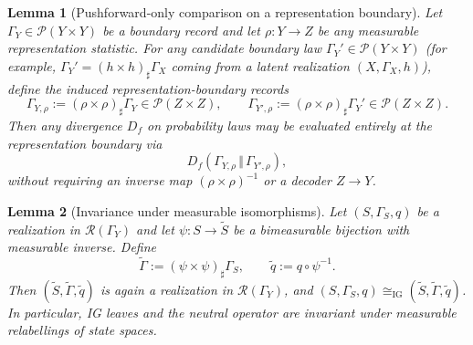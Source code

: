 \documentclass[11pt]{article}
\newtheorem{lemma}{Lemma}
\newcommand{\Pcal}{\mathcal{P}}
\begin{document}
\begin{lemma}[Pushforward-only comparison on a representation boundary]
\label{lem:pushforward-only-repboundary}
Let $\Gamma_Y\in\Pcal(Y\times Y)$ be a boundary record and let $\rho:Y\to Z$ be
any measurable \emph{representation statistic}.  For any candidate boundary law
$\Gamma_Y'\in\Pcal(Y\times Y)$ (for example, $\Gamma_Y'=(h\times h)_\sharp\Gamma_X$
coming from a latent realization $(X,\Gamma_X,h)$), define the induced
representation-boundary records
\[
  \Gamma_{Y,\rho}:=(\rho\times\rho)_\sharp\Gamma_Y
  \in \Pcal(Z\times Z),
  \qquad
  \Gamma_{Y',\rho}:=(\rho\times\rho)_\sharp\Gamma_Y'
  \in \Pcal(Z\times Z).
\]
Then any divergence $D_f$ on probability laws may be evaluated \emph{entirely at
the representation boundary} via
\[
  D_f(\Gamma_{Y,\rho}\,\Vert\,\Gamma_{Y',\rho}),
\]
without requiring an inverse map $(\rho\times\rho)^{-1}$ or a decoder $Z\to Y$.
\end{lemma}







\begin{lemma}[Invariance under measurable isomorphisms]
\label{lem:realization-relabel}
Let $(S,\Gamma_S,q)$ be a realization in $\mathcal{R}(\Gamma_Y)$ and let
$\psi:S\to \tilde S$ be a bimeasurable bijection with measurable inverse.
Define
\[
  \tilde \Gamma
  := (\psi\times\psi)_{\sharp}\Gamma_S,
  \qquad
  \tilde q := q\circ\psi^{-1}.
\]
Then $(\tilde S,\tilde\Gamma,\tilde q)$ is again a realization in
$\mathcal{R}(\Gamma_Y)$, and
$(S,\Gamma_S,q)\cong_{\mathrm{IG}}(\tilde S,\tilde\Gamma,\tilde q)$.
In particular, IG leaves and the neutral operator are invariant under
measurable relabellings of state spaces.
\end{lemma}
\end{document}
